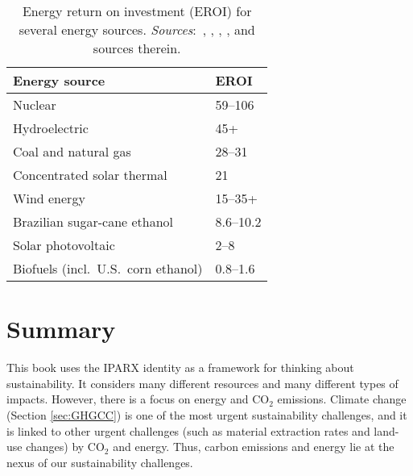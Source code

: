 \documentclass{article}\usepackage[]{graphicx}\usepackage[table]{xcolor}
\begin{document}
\begin{table}\centering
\caption[EROI for several energy sources]
        {Energy return on investment (EROI)
        for several energy sources.
\emph{Sources}:~\citet{Wikipedia_EROI}, \citet{WNA2020}, \citet{EtOH_in_BR}, \citet{Gomiero2015}, and sources therein.}
\label{tab:eroi}
\begin{tabular}{ll}
\toprule
Energy source                                 & EROI
\\ \midrule
Nuclear                 & 59--106 \\
Hydroelectric       & 45+ \\
Coal and natural gas & 28--31 \\
Concentrated solar thermal                    & 21 \\
Wind energy                                   & 15--35+ \\
Brazilian sugar-cane ethanol         & 8.6--10.2\\  %
Solar photovoltaic         & 2--8 \\
Biofuels (incl.\ U.S.\ corn ethanol)  & 0.8--1.6 \\ %
\bottomrule
\end{tabular}
\end{table}

\section{Summary}

This book uses the IPARX identity as a framework for 
thinking about sustainability.
It considers many different resources and many different types of impacts.
However, there is a focus on energy and CO$_2$ emissions.
Climate change (Section \ref{sec:GHGCC}) is one of the most
urgent sustainability challenges, and it is linked to other urgent challenges 
(such as material extraction rates and land-use changes) by CO$_2$ and energy.
Thus, carbon emissions and energy lie at the nexus of 
our sustainability challenges.
\end{document}

